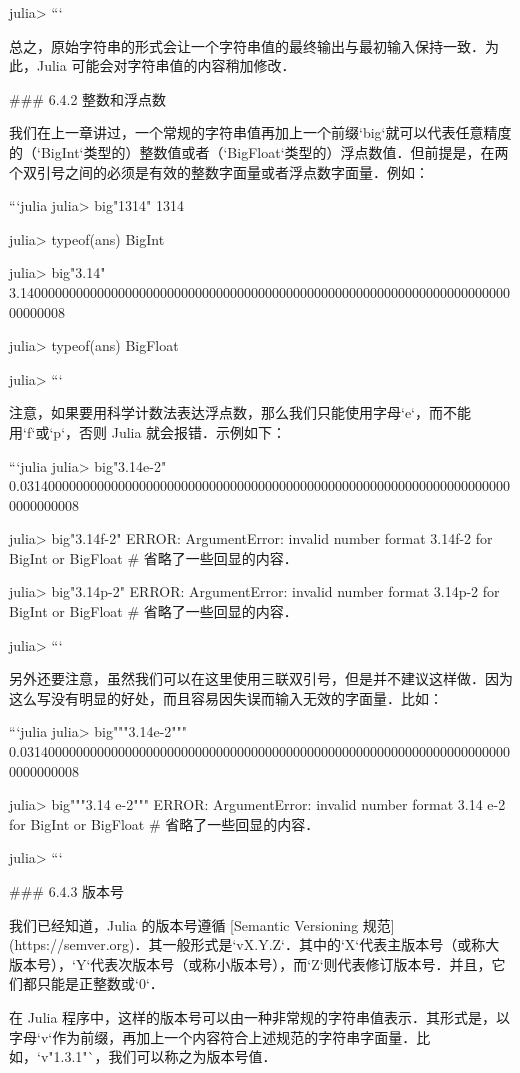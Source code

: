 julia> 
```

总之，原始字符串的形式会让一个字符串值的最终输出与最初输入保持一致．为此，Julia 可能会对字符串值的内容稍加修改．

### 6.4.2 整数和浮点数

我们在上一章讲过，一个常规的字符串值再加上一个前缀`big`就可以代表任意精度的（`BigInt`类型的）整数值或者（`BigFloat`类型的）浮点数值．但前提是，在两个双引号之间的必须是有效的整数字面量或者浮点数字面量．例如：

```julia
julia> big"1314"
1314

julia> typeof(ans)
BigInt

julia> big"3.14"
3.140000000000000000000000000000000000000000000000000000000000000000000000000008

julia> typeof(ans)
BigFloat

julia> 
```

注意，如果要用科学计数法表达浮点数，那么我们只能使用字母`e`，而不能用`f`或`p`，否则 Julia 就会报错．示例如下：

```julia
julia> big"3.14e-2"
0.03140000000000000000000000000000000000000000000000000000000000000000000000000008

julia> big"3.14f-2"
ERROR: ArgumentError: invalid number format 3.14f-2 for BigInt or BigFloat
# 省略了一些回显的内容．

julia> big"3.14p-2"
ERROR: ArgumentError: invalid number format 3.14p-2 for BigInt or BigFloat
# 省略了一些回显的内容．

julia> 
```

另外还要注意，虽然我们可以在这里使用三联双引号，但是并不建议这样做．因为这么写没有明显的好处，而且容易因失误而输入无效的字面量．比如：

```julia
julia> big"""3.14e-2"""
0.03140000000000000000000000000000000000000000000000000000000000000000000000000008

julia> big"""3.14
       e-2"""
ERROR: ArgumentError: invalid number format 3.14
e-2 for BigInt or BigFloat
# 省略了一些回显的内容．

julia> 
```

### 6.4.3 版本号

我们已经知道，Julia 的版本号遵循 [Semantic Versioning 规范](https://semver.org)．其一般形式是`vX.Y.Z`．其中的`X`代表主版本号（或称大版本号），`Y`代表次版本号（或称小版本号），而`Z`则代表修订版本号．并且，它们都只能是正整数或`0`．

在 Julia 程序中，这样的版本号可以由一种非常规的字符串值表示．其形式是，以字母`v`作为前缀，再加上一个内容符合上述规范的字符串字面量．比如，`v"1.3.1"`，我们可以称之为版本号值．

